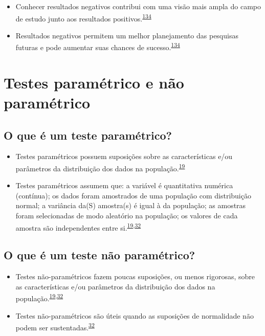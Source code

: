 \documentclass[
]{book}
\begin{document}
\begin{itemize}
\item
  Conhecer resultados negativos contribui com uma visão mais ampla do campo de estudo junto aos resultados positivos.\textsuperscript{\protect\hyperlink{ref-weintraub2016}{134}}
\item
  Resultados negativos permitem um melhor planejamento das pesquisas futuras e pode aumentar suas chances de sucesso.\textsuperscript{\protect\hyperlink{ref-weintraub2016}{134}}
\end{itemize}

\hypertarget{parametric-naoparametrico}{%
\section{Testes paramétrico e não paramétrico}\label{parametric-naoparametrico}}

\hypertarget{o-que-uxe9-um-teste-paramuxe9trico}{%
\subsection{O que é um teste paramétrico?}\label{o-que-uxe9-um-teste-paramuxe9trico}}

\begin{itemize}
\item
  Testes paramétricos possuem suposições sobre as características e/ou parâmetros da distribuição dos dados na população.\textsuperscript{\protect\hyperlink{ref-vetter2017}{19}}
\item
  Testes paramétricos assumem que: a variável é quantitativa numérica (contínua); os dados foram amostrados de uma população com distribuição normal; a variância da(S) amostra(s) é igual à da população; as amostras foram selecionadas de modo aleatório na população; os valores de cada amostra são independentes entre si.\textsuperscript{\protect\hyperlink{ref-vetter2017}{19},\protect\hyperlink{ref-Ali2016}{32}}
\end{itemize}

\hypertarget{o-que-uxe9-um-teste-nuxe3o-paramuxe9trico}{%
\subsection{O que é um teste não paramétrico?}\label{o-que-uxe9-um-teste-nuxe3o-paramuxe9trico}}

\begin{itemize}
\item
  Testes não-paramétricos fazem poucas suposições, ou menos rigorosas, sobre as características e/ou parâmetros da distribuição dos dados na população.\textsuperscript{\protect\hyperlink{ref-vetter2017}{19},\protect\hyperlink{ref-Ali2016}{32}}
\item
  Testes não-paramétricos são úteis quando as suposições de normalidade não podem ser sustentadas.\textsuperscript{\protect\hyperlink{ref-Ali2016}{32}}
\end{itemize}
\end{document}
